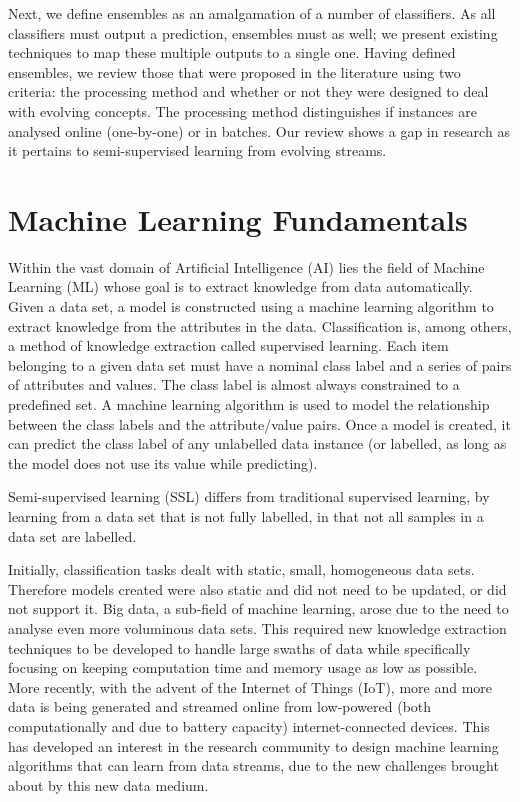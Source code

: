 Next, we define ensembles as an amalgamation of a number of classifiers. As all classifiers must output a prediction, ensembles must as well; we present existing techniques to map these multiple outputs to a single one. Having defined ensembles, we review those that were proposed in the literature using two criteria: the processing method and whether or not they were designed to deal with evolving concepts. The processing method distinguishes if instances are analysed online (one-by-one) or in batches. Our review shows a gap in research as it pertains to semi-supervised learning from evolving streams.

\section{Machine Learning Fundamentals}
Within the vast domain of Artificial Intelligence (AI) lies the field of Machine Learning (ML) whose goal is to extract knowledge from data automatically. Given a data set, a model is constructed using a machine learning algorithm to extract knowledge from the attributes in the data. 
Classification is, among others, a method of knowledge extraction called supervised learning. Each item belonging to a given data set must have a nominal class label and a series of pairs of attributes and values. The class label is almost always constrained to a predefined set. A machine learning algorithm is used to model the relationship between the class labels and the attribute/value pairs. Once a model is created, it can predict the class label of any unlabelled data instance (or labelled, as long as the model does not use its value while predicting).

Semi-supervised learning (SSL) differs from traditional supervised learning, by learning from a data set that is not fully labelled, in that not all samples in a data set are labelled.

Initially, classification tasks dealt with static, small, homogeneous data sets. Therefore models created were also static and did not need to be updated, or did not support it. 
Big data, a sub-field of machine learning, arose due to the need to analyse even more voluminous data sets. This required new knowledge extraction techniques to be developed to handle large swaths of data while specifically focusing on keeping computation time and memory usage as low as possible.
More recently, with the advent of the Internet of Things (IoT), more and more data is being generated and streamed online from low-powered (both computationally and due to battery capacity) internet-connected devices. This has developed an interest in the research community to design machine learning algorithms that can learn from data streams, due to the new challenges brought about by this new data medium.

